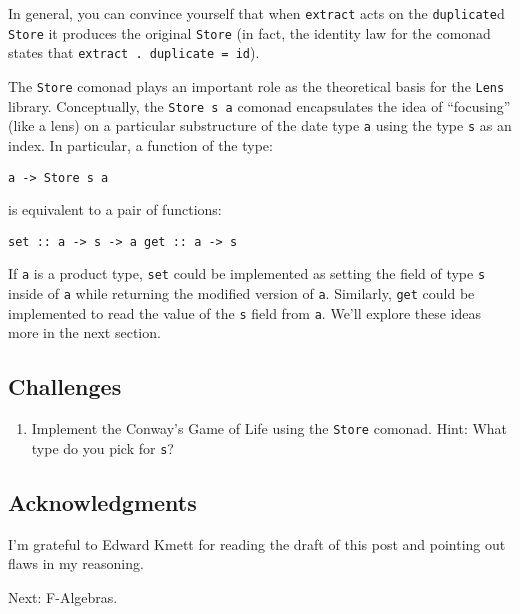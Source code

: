 In general, you can convince yourself that when \texttt{extract} acts on
the \texttt{duplicate}d \texttt{Store} it produces the original
\texttt{Store} (in fact, the identity law for the comonad states that
\texttt{extract\ .\ duplicate\ =\ id}).

The \texttt{Store} comonad plays an important role as the theoretical
basis for the \texttt{Lens} library. Conceptually, the
\texttt{Store\ s\ a} comonad encapsulates the idea of ``focusing'' (like
a lens) on a particular substructure of the date type \texttt{a} using
the type \texttt{s} as an index. In particular, a function of the type:

\begin{verbatim}
a -> Store s a
\end{verbatim}

is equivalent to a pair of functions:

\begin{verbatim}
set :: a -> s -> a get :: a -> s
\end{verbatim}

If \texttt{a} is a product type, \texttt{set} could be implemented as
setting the field of type \texttt{s} inside of \texttt{a} while
returning the modified version of \texttt{a}. Similarly, \texttt{get}
could be implemented to read the value of the \texttt{s} field from
\texttt{a}. We'll explore these ideas more in the next section.

\subsection{Challenges}\label{challenges}

\begin{enumerate}
\tightlist
\item
  Implement the Conway's Game of Life using the \texttt{Store} comonad.
  Hint: What type do you pick for \texttt{s}?
\end{enumerate}

\subsection{Acknowledgments}\label{acknowledgments}

I'm grateful to Edward Kmett for reading the draft of this post and
pointing out flaws in my reasoning.

Next: F-Algebras.
